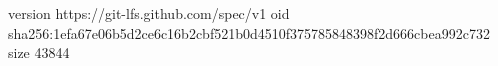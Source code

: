 version https://git-lfs.github.com/spec/v1
oid sha256:1efa67e06b5d2ce6c16b2cbf521b0d4510f375785848398f2d666cbea992c732
size 43844
